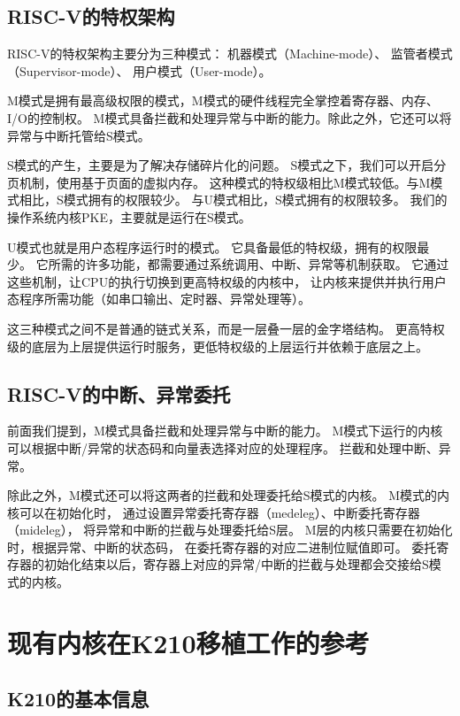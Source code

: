 \subsection{RISC-V的特权架构}

RISC-V的特权架构主要分为三种模式：
机器模式（Machine-mode）、
监管者模式（Supervisor-mode）、
用户模式（User-mode）。\cite{2015The}

M模式是拥有最高级权限的模式，M模式的硬件线程完全掌控着寄存器、内存、I/O的控制权。
M模式具备拦截和处理异常与中断的能力。除此之外，它还可以将异常与中断托管给S模式。

S模式的产生，主要是为了解决存储碎片化的问题。
S模式之下，我们可以开启分页机制，使用基于页面的虚拟内存。
这种模式的特权级相比M模式较低。与M模式相比，S模式拥有的权限较少。
与U模式相比，S模式拥有的权限较多。
我们的操作系统内核PKE，主要就是运行在S模式。

U模式也就是用户态程序运行时的模式。
它具备最低的特权级，拥有的权限最少。
它所需的许多功能，都需要通过系统调用、中断、异常等机制获取。
它通过这些机制，让CPU的执行切换到更高特权级的内核中，
让内核来提供并执行用户态程序所需功能（如串口输出、定时器、异常处理等）。

这三种模式之间不是普通的链式关系，而是一层叠一层的金字塔结构。
更高特权级的底层为上层提供运行时服务，更低特权级的上层运行并依赖于底层之上。

\subsection{RISC-V的中断、异常委托}

前面我们提到，M模式具备拦截和处理异常与中断的能力。
M模式下运行的内核可以根据中断/异常的状态码和向量表选择对应的处理程序。
拦截和处理中断、异常。

除此之外，M模式还可以将这两者的拦截和处理委托给S模式的内核。
M模式的内核可以在初始化时，
通过设置异常委托寄存器（medeleg）、中断委托寄存器（mideleg），
将异常和中断的拦截与处理委托给S层。
M层的内核只需要在初始化时，根据异常、中断的状态码，
在委托寄存器的对应二进制位赋值即可。
委托寄存器的初始化结束以后，寄存器上对应的异常/中断的拦截与处理都会交接给S模式的内核。

\section{现有内核在K210移植工作的参考}

\subsection{K210的基本信息}

